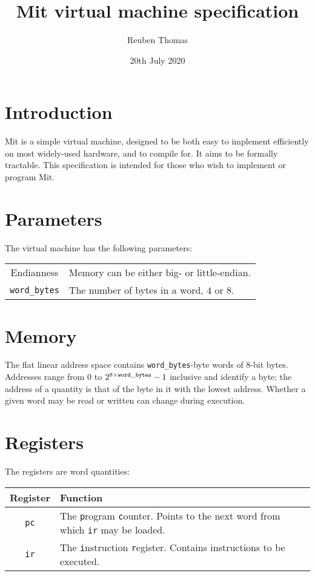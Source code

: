 \documentclass[a4paper]{article}
\title{Mit virtual machine specification}
\author{Reuben Thomas}
\date{20th July 2020}
\begin{document}
\maketitle

\section{Introduction}

Mit is a simple virtual machine, designed to be both easy to implement efficiently on most widely-used hardware, and to compile for. It aims to be formally tractable. This specification is intended for those who wish to implement or program Mit.


\section{Parameters}

The virtual machine has the following parameters:

\begin{center}
\begin{tabular}{cp{3.25in}} \toprule
Endianness & Memory can be either big- or little-endian. \\
{\tt word\_bytes} & The number of bytes in a word, $4$ or $8$. \\
 \bottomrule
\end{tabular}
\end{center}


\section{Memory}

The flat linear address space contains {\tt word\_bytes}-byte words of $8$-bit bytes. Addresses range from $0$ to $2^{8\times{\tt word\_bytes}}-1$ inclusive and identify a byte; the address of a quantity is that of the byte in it with the lowest address. Whether a given word may be read or written can change during execution.


\section{Registers}
\label{registers}

The registers are word quantities:

\begin{center}
\begin{tabular}{cp{3.75in}} \toprule
\bf Register & \bf Function \\
 \midrule
{\tt pc} & The {\tt p}rogram {\tt c}ounter. Points to the next word from which {\tt ir} may be loaded. \\
{\tt ir} & The {\tt i}nstruction {\tt r}egister. Contains instructions to be executed. \\
 \bottomrule
\end{tabular}
\end{center}
\end{document}
